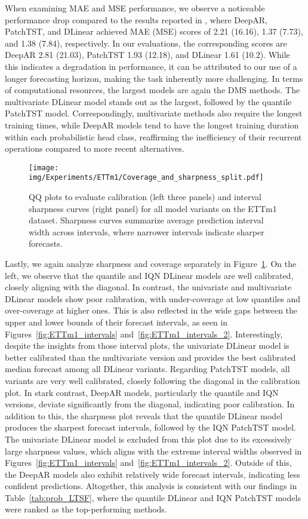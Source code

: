 \documentclass[a4paper,oneside,bibliography=totoc]{scrbook}
\begin{document}
When examining MAE and MSE performance, we observe a noticeable performance drop compared to the results reported in \citet{shao_exploring_2025}, where DeepAR, PatchTST, and DLinear achieved MAE (MSE) scores of 2.21 (16.16), 1.37 (7.73), and 1.38 (7.84), respectively. In our evaluations, the corresponding scores are DeepAR 2.81 (21.03), PatchTST 1.93 (12.18), and DLinear 1.61 (10.2). While this indicates a degradation in performance, it can be attributed to our use of a longer forecasting horizon, making the task inherently more challenging.
In terms of computational resources, the largest models are again the DMS methods. The multivariate DLinear model stands out as the largest, followed by the quantile PatchTST model. Correspondingly, multivariate methods also require the longest training times, while DeepAR models tend to have the longest training duration within each probabilistic head class, reaffirming the inefficiency of their recurrent operations compared to more recent alternatives.
\begin{figure}
\centering
\texttt{[image: img/Experiments/ETTm1/Coverage\_and\_sharpness\_split.pdf]}
\caption{QQ plots to evaluate calibration (left three panels) and interval sharpness curves (right panel) for all model variants on the ETTm1 dataset. 
Sharpness curves summarize average prediction interval width across intervals, where narrower intervals indicate sharper forecasts.}
\label{fig:cov_sha_ettm1}
\end{figure}
Lastly, we again analyze sharpness and coverage separately in Figure~\ref{fig:cov_sha_ettm1}. On the left, we observe that the quantile and IQN DLinear models are well calibrated, closely aligning with the diagonal. In contrast, the univariate and multivariate DLinear models show poor calibration, with under-coverage at low quantiles and over-coverage at higher ones. This is also reflected in the wide gaps between the upper and lower bounds of their forecast intervals, as seen in Figures~\ref{fig:ETTm1_intervals} and~\ref{fig:ETTm1_intervals_2}.
Interestingly, despite the insights from those interval plots, the univariate DLinear model is better calibrated than the multivariate version and provides the best calibrated median forecast among all DLinear variants. 
Regarding PatchTST models, all variants are very well calibrated, closely following the diagonal in the calibration plot. 
In stark contrast, DeepAR models, particularly the quantile and IQN versions, deviate significantly from the diagonal, indicating poor calibration.
In addition to this, the sharpness plot reveals that the quantile DLinear model produces the sharpest forecast intervals, followed by the IQN PatchTST model. The univariate DLinear model is excluded from this plot due to its excessively large sharpness values, which aligns with the extreme interval widths observed in Figures~\ref{fig:ETTm1_intervals} and~\ref{fig:ETTm1_intervals_2}. Outside of this, the DeepAR models also exhibit relatively wide forecast intervals, indicating less confident predictions.
Altogether, this analysis is consistent with our findings in Table~\ref{tab:prob_LTSF}, where the quantile DLinear and IQN PatchTST models were ranked as the top-performing methods.
\end{document}
